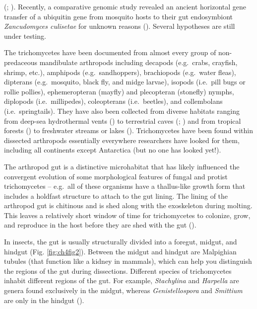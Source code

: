 \documentclass[]{book}
\begin{document}
(\citet{Sweeney_1981}; \citet{White_2006}). Recently, a comparative genomic study revealed an ancient horizontal gene transfer of a ubiquitin gene from mosquito hosts to their gut endosymbiont \emph{Zancudomyces culisetae} for unknown reasons (\citet{Wang_2016}). Several hypotheses are still under testing.

The trichomycetes have been documented from almost every group of non-predaceous mandibulate arthropods including decapods (e.g.~crabs, crayfish, shrimp, etc.), amphipods (e.g.~sandhoppers), brachiopods (e.g.~water fleas), dipterans (e.g.~mosquito, black fly, and midge larvae), isopods (i.e.~pill bugs or rollie pollies), ephemeropteran (mayfly) and plecopteran (stonefly) nymphs, diplopods (i.e.~millipedes), coleopterans (i.e.~beetles), and collembolans (i.e.~springtails). They have also been collected from diverse habitats ranging from deep-sea hydrothermal vents (\citet{Van_Dover_1986}) to terrestrial caves (\citet{Manier_1964}; \citet{Reeves_2000}) and from tropical forests (\citet{White_2000}) to freshwater streams or lakes (\citet{Lichtwardt_2001}). Trichomycetes have been found within dissected arthropods essentially everywhere researchers have looked for them, including all continents except Antarctica (but no one has looked yet!).

The arthropod gut is a distinctive microhabitat that has likely influenced the convergent evolution of some morphological features of fungal and protist trichomycetes -- e.g.~all of these organisms have a thallus-like growth form that includes a holdfast structure to attach to the gut lining. The lining of the arthropod gut is chitinous and is shed along with the exoskeleton during molting. This leaves a relatively short window of time for trichomycetes to colonize, grow, and reproduce in the host before they are shed with the gut (\citet{Lichtwardt_1986}).

In insects, the gut is usually structurally divided into a foregut, midgut, and hindgut (Fig. \ref{fig:ch4fig2}). Between the midgut and hindgut are Malpighian tubules (that function like a kidney in mammals), which can help you distinguish the regions of the gut during dissections. Different species of trichomycetes inhabit different regions of the gut. For example, \emph{Stachylina} and \emph{Harpella} are genera found exclusively in the midgut, whereas \emph{Genistellospora} and \emph{Smittium} are only in the hindgut (\citet{Lichtwardt_1986}).
\end{document}
